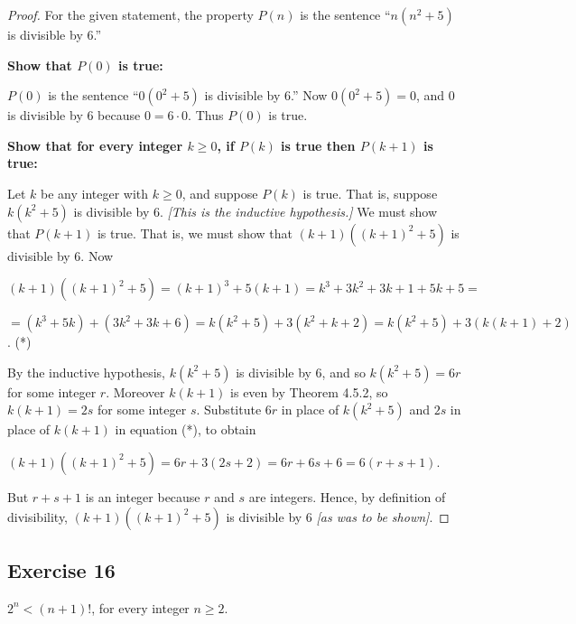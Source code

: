 \documentclass[14pt]{extarticle}
\begin{document}
\begin{proof}
    For the given statement, the property $P(n)$ is the sentence “$n(n^2 + 5)$ is divisible by 6.”

    {\bf Show that $P(0)$ is true:}

    $P(0)$ is the sentence “$0(0^2 + 5)$ is divisible by 6.” Now $0(0^2 + 5) = 0$, and 0 is divisible by 6 because $0 = 6 \cdot 0$. Thus $P(0)$ is true.

        {\bf Show that for every integer $k \geq 0$, if $P(k)$ is true then $P(k + 1)$ is true:}

    Let $k$ be any integer with $k \geq 0$, and suppose $P(k)$ is true. That is, suppose $k(k^2 + 5)$ is divisible by 6. {\it [This is the inductive hypothesis.]} We must show that $P(k + 1)$ is true. That is, we must show that $(k+1)((k+1)^2 + 5)$ is divisible by 6. Now

    $(k+1)((k+1)^2 + 5) = (k+1)^3 + 5(k+1) = k^3 + 3k^2 + 3k + 1 + 5k + 5 =$

    $= (k^3 + 5k) + (3k^2 + 3k + 6) = k(k^2 + 5) + 3(k^2 + k + 2) = k(k^2 + 5) + 3(k(k+1) + 2)$. (*)

    By the inductive hypothesis, $k(k^2 + 5)$ is divisible by 6, and so $k(k^2 + 5) = 6r$ for some integer $r$. Moreover $k(k+1)$ is even by Theorem 4.5.2, so $k(k+1) = 2s$ for some integer $s$. Substitute $6r$ in place of $k(k^2 + 5)$ and $2s$ in place of $k(k+1)$ in equation (*), to obtain

    $(k+1)((k+1)^2 + 5) = 6r + 3(2s + 2) = 6r + 6s + 6 = 6(r + s + 1)$.

    But $r + s + 1$ is an integer because $r$ and $s$ are integers. Hence, by definition of divisibility, $(k + 1)((k + 1)^2 + 5)$ is divisible by 6 {\it [as was to be shown]}.
\end{proof}

\subsection{Exercise 16}
$2^n < (n + 1)!$, for every integer $n \geq 2$.
\end{document}
